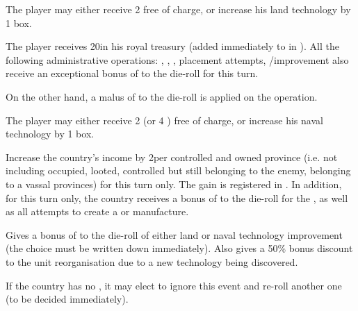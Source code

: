 
The player may either receive 2 \LD free of charge, or increase his land
technology by 1 box.




The player receives 20\ducats in his royal treasury (added immediately to
 in ). All the
following administrative operations: \TFI, \TPaction, \COLaction, \MNU
placement attempts, \DTI/\FTI improvement also receive an exceptional bonus of
 to the die-roll for this turn.

On the other hand, a malus of  to the die-roll is applied on the
 operation.




The player may either receive 2 \NWD (or 4 \NGD) free of charge, or increase
his naval technology by 1 box.




Increase the country's income by 2\ducats per controlled and owned province
(i.e. not including occupied, looted, controlled but still belonging to the
enemy, belonging to a vassal provinces) for this turn only. The gain is
registered in . In addition, for this turn only, the
country receives a bonus of  to the die-roll for the
, as well as all attempts to create a 
or  manufacture.




Gives a bonus of  to the die-roll of either land or naval technology
improvement (the choice must be written down immediately). Also gives a 50\%
bonus discount to the unit reorganisation due to a new technology being
discovered.




If the country has no \anonyme\LeaderC, it may elect to ignore this event and
re-roll another one (to be decided immediately).

